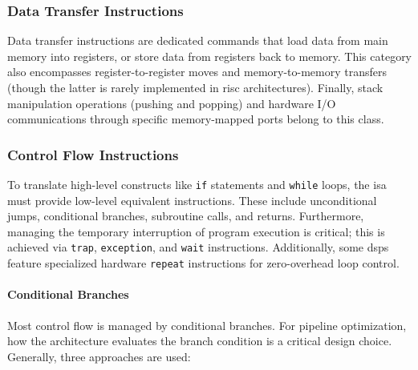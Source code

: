 \subsubsection{Data Transfer Instructions} 
Data transfer instructions are dedicated commands that load data from main memory into registers, or store data from registers back to memory. This category also encompasses register-to-register moves and memory-to-memory transfers (though the latter is rarely implemented in \gls{risc} architectures). Finally, stack manipulation operations (pushing and popping) and hardware I/O communications through specific memory-mapped ports belong to this class.

\subsubsection{Control Flow Instructions}
To translate high-level constructs like \texttt{if} statements and \texttt{while} loops, the \gls{isa} must provide low-level equivalent instructions. These include unconditional jumps, conditional branches, subroutine calls, and returns. Furthermore, managing the temporary interruption of program execution is critical; this is achieved via \texttt{trap}, \texttt{exception}, and \texttt{wait} instructions. Additionally, some \glspl{dsp} feature specialized hardware \texttt{repeat} instructions for zero-overhead loop control.

\paragraph{Conditional Branches}
Most control flow is managed by conditional branches. For pipeline optimization, how the architecture evaluates the branch condition is a critical design choice. Generally, three approaches are used:

